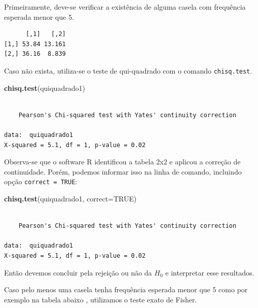 \documentclass[12pt,brazil,oneside]{book}
\newenvironment{Shaded}{\begin{snugshade}}{\end{snugshade}}
\newcommand{\DataTypeTok}[1]{\textcolor[rgb]{0.13,0.29,0.53}{#1}}
\newcommand{\KeywordTok}[1]{\textcolor[rgb]{0.13,0.29,0.53}{\textbf{#1}}}
\newcommand{\NormalTok}[1]{#1}
\newcommand{\OperatorTok}[1]{\textcolor[rgb]{0.81,0.36,0.00}{\textbf{#1}}}
\newcommand{\OtherTok}[1]{\textcolor[rgb]{0.56,0.35,0.01}{#1}}
\begin{document}
Primeiramente, deve-se verificar a existência de alguma casela com frequência esperada menor que 5.

\begin{Shaded}
\end{Shaded}

\begin{verbatim}
      [,1]   [,2]
[1,] 53.84 13.161
[2,] 36.16  8.839
\end{verbatim}

Caso não exista, utiliza-se o teste de qui-quadrado com o comando \texttt{chisq.test}.

\begin{Shaded}
\begin{Highlighting}[]
\KeywordTok{chisq.test}\NormalTok{(quiquadrado1)}
\end{Highlighting}
\end{Shaded}

\begin{verbatim}

    Pearson's Chi-squared test with Yates' continuity correction

data:  quiquadrado1
X-squared = 5.1, df = 1, p-value = 0.02
\end{verbatim}

Observa-se que o software R identificou a tabela 2x2 e aplicou a correção de continuidade. Porém, podemos informar isso na linha de comando, incluindo opção \texttt{correct\ =\ TRUE}:

\begin{Shaded}
\begin{Highlighting}[]
\KeywordTok{chisq.test}\NormalTok{(quiquadrado1, }\DataTypeTok{correct=}\OtherTok{TRUE}\NormalTok{)}
\end{Highlighting}
\end{Shaded}

\begin{verbatim}

    Pearson's Chi-squared test with Yates' continuity correction

data:  quiquadrado1
X-squared = 5.1, df = 1, p-value = 0.02
\end{verbatim}

Então devemos concluir pela rejeição ou não da \(H_0\) e interpretar esse resultados.

Caso pelo menos uma casela tenha frequência esperada menor que 5 como por exemplo na tabela abaixo , utilizamos o teste exato de Fisher.
\end{document}
